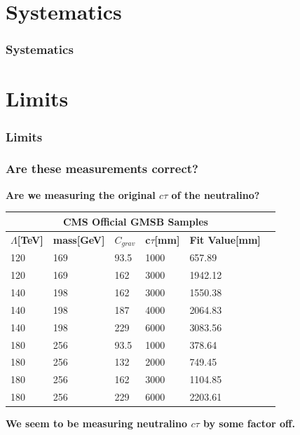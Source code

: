 \documentclass{beamer}
\begin{document}
\section{Systematics}
\begin{frame}
\frametitle{\Huge Systematics}
\end{frame}
\section{Limits}
\begin{frame}
\frametitle{\Huge Limits}
\end{frame}
\begin{frame} %
\frametitle{Are these measurements correct?}
\begin{LARGE}
\textbf{Are we measuring the original $c\tau$ of the neutralino?}
\end{LARGE}
\vspace{-0.5cm}
\begin{table}
\begin{minipage}[b]{1.0\linewidth}
\centering
\begin{tabular}{|l||l||l||l|l|l|}
\hline
\multicolumn{5}{|c|}{\bfseries{CMS Official GMSB Samples}} \\
\hline
\bfseries{$\Lambda$[TeV]} & \bfseries{mass[GeV]} & \bfseries{$C_{grav}$} & \bfseries{c$\tau$[mm]} & \bfseries{Fit Value[mm]} \\
\hline
120 & 169 & 93.5 & 1000 & 657.89 \\
120 & 169 & 162 & 3000 &1942.12 \\
\hline
\hline
140 & 198 & 162 & 3000 & 1550.38 \\
140 & 198 & 187 & 4000 & 2064.83 \\
140 & 198 & 229 & 6000 & 3083.56 \\
\hline
\hline
180 & 256 & 93.5 & 1000 & 378.64 \\
180 & 256 & 132 & 2000 & 749.45 \\
180 & 256 & 162 & 3000 & 1104.85 \\
180 & 256 & 229 & 6000 & 2203.61 \\
\hline
\end{tabular}
\end{minipage}
\end{table}
\vspace{-0.5cm}
\alert{\textbf{We seem to be measuring neutralino $c\tau$ by some factor off.}}
\end{frame}
\end{document}
